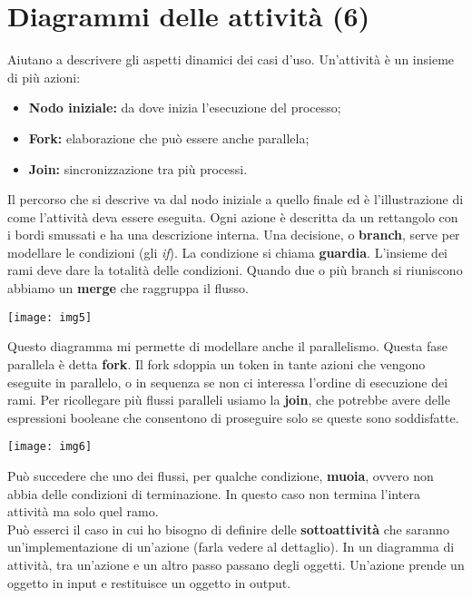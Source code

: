 



\section{Diagrammi delle attività (6)}

Aiutano a descrivere gli aspetti dinamici dei casi d'uso. Un'attività è un insieme di più azioni:
\begin{itemize}
	\item \textbf{Nodo iniziale:} da dove inizia l'esecuzione del processo;
	\item \textbf{Fork:} elaborazione che può essere anche parallela;
	\item \textbf{Join:} sincronizzazione tra più processi.
\end{itemize}


Il percorso che si descrive va dal nodo iniziale a quello finale ed è l'illustrazione di come l'attività deva essere eseguita. Ogni azione è descritta da un rettangolo con i bordi smussati e ha una descrizione interna. Una decisione, o \textbf{branch}, serve per modellare le condizioni (gli \textit{if}). La condizione si chiama \textbf{guardia}. L'insieme dei rami deve dare la totalità delle condizioni. Quando due o più branch si riuniscono abbiamo un \textbf{merge} che raggruppa il flusso.

\texttt{[image: img5]} %

Questo diagramma mi permette di modellare anche il parallelismo. Questa fase parallela è detta \textbf{fork}. Il fork sdoppia un token in tante azioni che vengono eseguite in parallelo, o in sequenza se non ci interessa l'ordine di esecuzione dei rami. Per ricollegare più flussi paralleli usiamo la \textbf{join}, che potrebbe avere delle espressioni booleane che consentono di proseguire solo se queste sono soddisfatte.

\texttt{[image: img6]} %

Può succedere che uno dei flussi, per qualche condizione, \textbf{muoia}, ovvero non abbia delle condizioni di terminazione. In questo caso non termina l'intera attività ma 
solo quel ramo.\\

Può esserci il caso in cui ho bisogno di definire delle \textbf{sottoattività} che saranno un'implementazione di un'azione (farla vedere al dettaglio). In un diagramma di attività, tra un'azione e un altro passo passano degli oggetti. Un'azione prende un oggetto in input e restituisce un oggetto in output.

